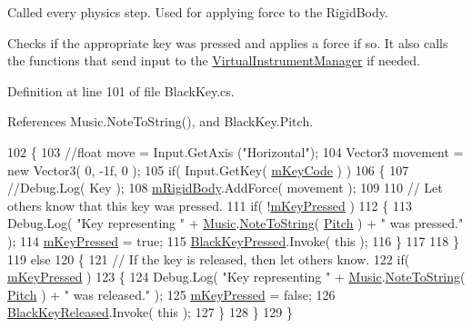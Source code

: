 Called every physics step. Used for applying force to the Rigid\+Body. 

Checks if the appropriate key was pressed and applies a force if so. It also calls the functions that send input to the \hyperlink{class_virtual_instrument_manager}{Virtual\+Instrument\+Manager} if needed. 

Definition at line 101 of file Black\+Key.\+cs.



References Music.\+Note\+To\+String(), and Black\+Key.\+Pitch.


\begin{DoxyCode}
102     \{
103         \textcolor{comment}{//float move = Input.GetAxis ("Horizontal");}
104         Vector3 movement = \textcolor{keyword}{new} Vector3( 0, -1f, 0 );
105         \textcolor{keywordflow}{if}( Input.GetKey( \hyperlink{group___black_key_priv_var_ga2272fa345880793dcd89f7ca942f6685}{mKeyCode} ) )
106         \{
107             \textcolor{comment}{//Debug.Log( Key );}
108             \hyperlink{group___black_key_priv_var_ga5185c6ea66892bcbe9e83eb615f39566}{mRigidBody}.AddForce( movement );
109 
110             \textcolor{comment}{// Let others know that this key was pressed.}
111             \textcolor{keywordflow}{if}( !\hyperlink{group___black_key_priv_var_gaf66e1f99786497961efaf5ded22e4977}{mKeyPressed} )
112             \{
113                 Debug.Log( \textcolor{stringliteral}{"Key representing "} + \hyperlink{class_music}{Music}.\hyperlink{group___music_stat_func_ga85a22c905d56d4c5f4e62159bfecee8c}{NoteToString}( 
      \hyperlink{group___black_key_pub_var_gad233c456182c9cef7c01486484940439}{Pitch} ) + \textcolor{stringliteral}{" was pressed."} );
114                 \hyperlink{group___black_key_priv_var_gaf66e1f99786497961efaf5ded22e4977}{mKeyPressed} = \textcolor{keyword}{true};
115                 \hyperlink{group___black_key_events_ga51f1badf49df0c54e31a20ba4b7abd6b}{BlackKeyPressed}.Invoke( \textcolor{keyword}{this} );
116             \}
117 
118         \}
119         \textcolor{keywordflow}{else}
120         \{
121             \textcolor{comment}{// If the key is released, then let others know.}
122             \textcolor{keywordflow}{if}( \hyperlink{group___black_key_priv_var_gaf66e1f99786497961efaf5ded22e4977}{mKeyPressed} )
123             \{
124                 Debug.Log( \textcolor{stringliteral}{"Key representing "} + \hyperlink{class_music}{Music}.\hyperlink{group___music_stat_func_ga85a22c905d56d4c5f4e62159bfecee8c}{NoteToString}( 
      \hyperlink{group___black_key_pub_var_gad233c456182c9cef7c01486484940439}{Pitch} ) + \textcolor{stringliteral}{" was released."} );
125                 \hyperlink{group___black_key_priv_var_gaf66e1f99786497961efaf5ded22e4977}{mKeyPressed} = \textcolor{keyword}{false};
126                 \hyperlink{group___black_key_events_ga2710bdaba16dbdb82c0d38f11ce642d8}{BlackKeyReleased}.Invoke( \textcolor{keyword}{this} );
127             \}
128         \}
129     \}
\end{DoxyCode}
\mbox{\label{group___black_key_unity_ga24ef6b8b614685c5591868b9b23197ed}} 
